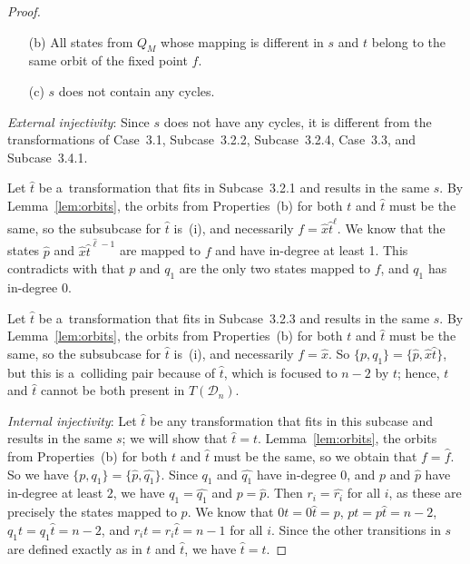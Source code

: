 \documentclass{amsart}
\newcommand{\e}[1]{\hat{#1}}
\newcommand{\cD}{{\mathcal D}}
\begin{document}
\begin{proof}
\begin{enumerate}
\item[(b)] All states from $Q_M$ whose mapping is different in $s$ and $t$ belong to the same orbit of the fixed point $f$.

\item[(c)] $s$ does not contain any cycles.
\end{enumerate}

\textit{External injectivity}:
Since $s$ does not have any cycles, it is different from the transformations of Case~3.1, Subcase~3.2.2, Subcase~3.2.4, Case~3.3, and Subcase~3.4.1.

Let $\e{t}$ be a~transformation that fits in Subcase~3.2.1 and results in the same $s$.
By Lemma~\ref{lem:orbits}, the orbits from Properties~(b) for both $t$ and $\e{t}$ must be the same, so the subsubcase for $\e{t}$ is~(i), and necessarily $f = \e{x}\e{t}^{\e{\ell}}$.
We know that the states $\e{p}$ and $\e{x}\e{t}^{\e{\ell}-1}$ are mapped to $f$ and have in-degree at least 1.
This contradicts with that $p$ and $q_1$ are the only two states mapped to $f$, and $q_1$ has in-degree 0.

Let $\e{t}$ be a~transformation that fits in Subcase~3.2.3 and results in the same $s$.
By Lemma~\ref{lem:orbits}, the orbits from Properties~(b) for both $t$ and $\e{t}$ must be the same, so the subsubcase for $\e{t}$ is~(i), and necessarily $f = \e{x}$.
So $\{p,q_1\} = \{\e{p},\e{x}\e{t}\}$, but this is a~colliding pair because of $\e{t}$, which is focused to $n-2$ by $t$; hence, $t$ and $\e{t}$ cannot be both present in $T(\cD_n)$.

\textit{Internal injectivity}:
Let $\e{t}$ be any transformation that fits in this subcase and results in the same $s$; we will show that $\e{t}=t$.
Lemma~\ref{lem:orbits}, the orbits from Properties~(b) for both $t$ and $\e{t}$ must be the same, so we obtain that $f=\e{f}$.
So we have $\{p,q_1\} = \{\e{p},\e{q_1}\}$.
Since $q_1$ and $\e{q_1}$ have in-degree 0, and $p$ and $\e{p}$ have in-degree at least $2$, we have $q_1 = \e{q_1}$ and $p = \e{p}$.
Then $r_i = \e{r_i}$ for all $i$, as these are precisely the states mapped to $p$.
We know that $0t = 0\e{t} = p$, $pt = p\e{t} = n-2$, $q_1 t = q_1 \e{t} = n-2$, and $r_i t = r_i \e{t} = n-1$ for all $i$.
Since the other transitions in $s$ are defined exactly as in $t$ and $\e{t}$, we have $\e{t} = t$.


\end{proof}
\end{document}
